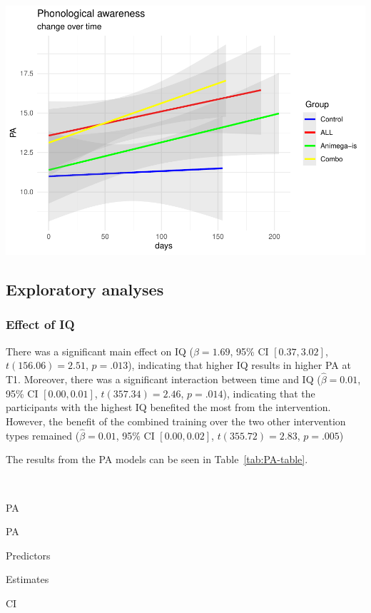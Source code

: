 \documentclass[
  english,
  ,man]{apa6}
\begin{document}
\includegraphics{Effects_of_training_files/figure-latex/PA-plot-1.pdf}

\hypertarget{exploratory-analyses}{%
\subsection{Exploratory analyses}\label{exploratory-analyses}}

\hypertarget{effect-of-iq}{%
\subsubsection{Effect of IQ}\label{effect-of-iq}}

There was a significant main effect on IQ (\(\hat{\beta} = 1.69\), 95\% CI \([0.37, 3.02]\), \(t(156.06) = 2.51\), \(p = .013\)), indicating that higher IQ results in higher PA at T1. Moreover, there was a significant interaction between time and IQ (\(\hat{\beta} = 0.01\), 95\% CI \([0.00, 0.01]\), \(t(357.34) = 2.46\), \(p = .014\)), indicating that the participants with the highest IQ benefited the most from the intervention. However, the benefit of the combined training over the two other intervention types remained (\(\hat{\beta} = 0.01\), 95\% CI \([0.00, 0.02]\), \(t(355.72) = 2.83\), \(p = .005\))

The results from the PA models can be seen in Table~\ref{tab:PA-table}.

~

PA

PA

Predictors

Estimates

CI
\end{document}
